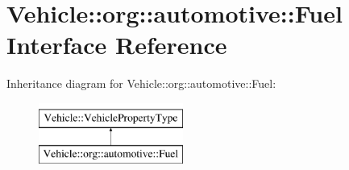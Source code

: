 \hypertarget{interfaceVehicle_1_1org_1_1automotive_1_1Fuel}{\section{Vehicle\-:\-:org\-:\-:automotive\-:\-:Fuel Interface Reference}
\label{interfaceVehicle_1_1org_1_1automotive_1_1Fuel}
}
Inheritance diagram for Vehicle\-:\-:org\-:\-:automotive\-:\-:Fuel\-:\begin{figure}[H]
\begin{center}
\leavevmode
\includegraphics[height=2.000000cm]{interfaceVehicle_1_1org_1_1automotive_1_1Fuel}
\end{center}
\end{figure}
